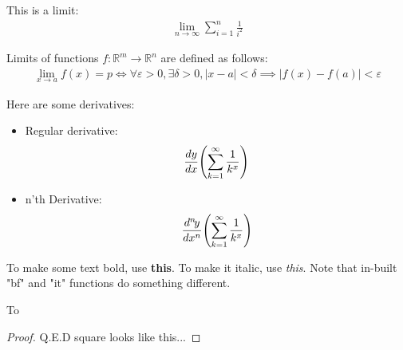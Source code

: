 \documentclass[fleqn]{article}
\renewcommand{\bf}[1]{\textbf{#1}}
\renewcommand{\it}[1]{\textit{#1}}
\newcommand{\R}{\mathbb{R}}
\newcommand{\fn}[3]{#1 : #2 \rightarrow #3}
\newcommand{\br}[1]{\left( #1 \right)}
\newcommand{\eqn}[1]{\begin{eqnarray*} #1 \end{eqnarray*}}
\newcommand{\abs}[1]{\left| #1 \right|}
\newcommand{\eps}{\varepsilon}%
\newcommand{\del}{\delta}
\newcommand{\limit}[3]{\lim_{#1 \rightarrow #2}#3}
\newcommand{\diff}[3][]{%
	\ifthenelse{\equal{#1}{}}{%
		\ensuremath{\frac{d{#2}}{d{#3}}}%
	}{%
		\ensuremath{\frac{d^{#1}\!{#2}}{d{#3}^{#1}}}%
	}%
}
\begin{document}
This is a limit:
\eqn{
  \limit{n}{\infty}{\sum_{i = 1}^n \frac{1}{i^2}}
}

Limits of functions $\fn{f}{\R^m}{\R^n}$ are defined as follows:
\eqn{
  \limit{x}{a}{f(x)} = p \iff
    \forall \eps > 0, \exists \del > 0, \abs{x - a} < \del
    \implies \abs{f(x) - f(a)} < \eps
}

Here are some derivatives:
\begin{itemize}
  \item Regular derivative:
  \eqn{
    \diff{y}{x}{\br{\sum_{k = 1}^{\infty}\frac{1}{k^x}}}
  }
  \item n'th Derivative: 
  \eqn{
    \diff[n]{y}{x}{\br{\sum_{k = 1}^{\infty}\frac{1}{k^x}}}
  }
\end{itemize}

To make some text bold, use \bf{this}. To make it italic, use \it{this}. Note that
in-built "bf" and "it" functions do something different.

To 
\begin{proof}
    Q.E.D square looks like this...
\end{proof}
\end{document}
